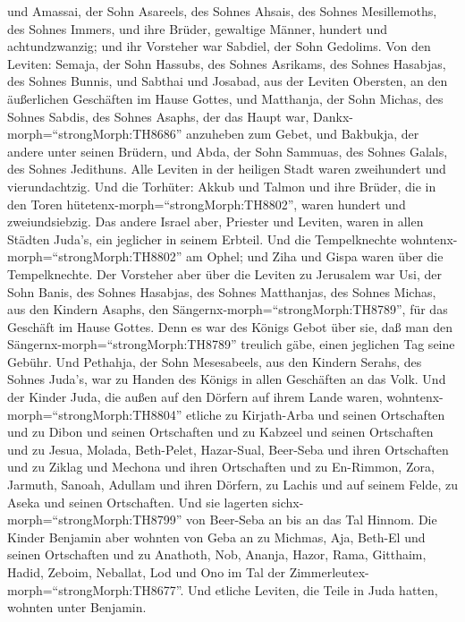 und Amassai, der Sohn Asareels, des Sohnes Ahsais, des Sohnes
Mesillemoths, des Sohnes Immers,  und ihre Brüder,
gewaltige Männer, hundert und achtundzwanzig; und ihr Vorsteher war
Sabdiel, der Sohn Gedolims.  Von den Leviten: Semaja, der
Sohn Hassubs, des Sohnes Asrikams, des Sohnes Hasabjas, des Sohnes
Bunnis,  und Sabthai und Josabad, aus der Leviten Obersten,
an den äußerlichen Geschäften im Hause Gottes,  und
Matthanja, der Sohn Michas, des Sohnes Sabdis, des Sohnes Asaphs, der
das Haupt war, Dankx-morph=``strongMorph:TH8686'' anzuheben zum Gebet,
und Bakbukja, der andere unter seinen Brüdern, und Abda, der Sohn
Sammuas, des Sohnes Galals, des Sohnes Jedithuns.  Alle
Leviten in der heiligen Stadt waren zweihundert und vierundachtzig.
 Und die Torhüter: Akkub und Talmon und ihre Brüder, die in
den Toren hütetenx-morph=``strongMorph:TH8802'', waren hundert und
zweiundsiebzig.  Das andere Israel aber, Priester und
Leviten, waren in allen Städten Juda's, ein jeglicher in seinem Erbteil.
 Und die Tempelknechte
wohntenx-morph=``strongMorph:TH8802'' am Ophel; und Ziha und Gispa waren
über die Tempelknechte.  Der Vorsteher aber über die
Leviten zu Jerusalem war Usi, der Sohn Banis, des Sohnes Hasabjas, des
Sohnes Matthanjas, des Sohnes Michas, aus den Kindern Asaphs, den
Sängernx-morph=``strongMorph:TH8789'', für das Geschäft im Hause Gottes.
 Denn es war des Königs Gebot über sie, daß man den
Sängernx-morph=``strongMorph:TH8789'' treulich gäbe, einen jeglichen Tag
seine Gebühr.  Und Pethahja, der Sohn Mesesabeels, aus den
Kindern Serahs, des Sohnes Juda's, war zu Handen des Königs in allen
Geschäften an das Volk.  Und der Kinder Juda, die außen auf
den Dörfern auf ihrem Lande waren, wohntenx-morph=``strongMorph:TH8804''
etliche zu Kirjath-Arba und seinen Ortschaften und zu Dibon und seinen
Ortschaften und zu Kabzeel und seinen Ortschaften  und zu
Jesua, Molada, Beth-Pelet,  Hazar-Sual, Beer-Seba und ihren
Ortschaften  und zu Ziklag und Mechona und ihren
Ortschaften  und zu En-Rimmon, Zora, Jarmuth, 
Sanoah, Adullam und ihren Dörfern, zu Lachis und auf seinem Felde, zu
Aseka und seinen Ortschaften. Und sie lagerten
sichx-morph=``strongMorph:TH8799'' von Beer-Seba an bis an das Tal
Hinnom.  Die Kinder Benjamin aber wohnten von Geba an zu
Michmas, Aja, Beth-El und seinen Ortschaften  und zu
Anathoth, Nob, Ananja,  Hazor, Rama, Gitthaim,
 Hadid, Zeboim, Neballat,  Lod und Ono im Tal
der Zimmerleutex-morph=``strongMorph:TH8677''.  Und etliche
Leviten, die Teile in Juda hatten, wohnten unter Benjamin.

